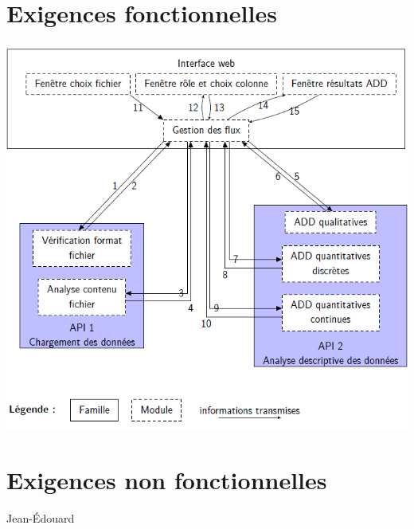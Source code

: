 	\section{Exigences fonctionnelles}
	\begin{frame}
		\begin{center}\includegraphics[scale=0.43]{org.png}\end{center}
	\end{frame}
	
	\section{Exigences non fonctionnelles}
	\begin{frame}
		Jean-Édouard
	\end{frame}
	
